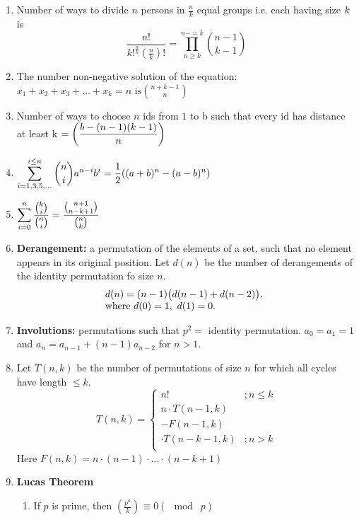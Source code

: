 \begin{enumerate}
    \item Number of ways to divide $n$ persons in $\displaystyle \frac{n}{k}$ equal groups i.e. each having size $\displaystyle \displaystyle k$ is
    \[\displaystyle \frac{n!}{k!^{\frac{n}{k}} \left( \frac{n}{k} \right) !}= \prod \limits_{n \geq k}^{n-=k}{n-1 \choose k-1}\]
    \item The number non-negative solution of the equation: $\displaystyle x_1+x_2+x_3+\dots+x_k=n \text{ is}{n+k-1 \choose n}$
    \item Number of ways to choose $n$ ids from $\displaystyle 1$ to b such that every id has distance at least k $\displaystyle \displaystyle =\left( \frac{b-(n-1)(k-1)}{n} \right)$
    \item $\displaystyle \displaystyle \sum \limits_{i=1,3,5,\dots}^{i\leq n} \binom{n}{i} a^{n-i}b^i = \frac{1}{2} ((a+b)^n-(a-b)^n)$
    \item $\displaystyle \displaystyle \sum \limits_{i=0}^{n} \dfrac{\binom{k}{i}}{\binom{n}{i}} = \dfrac{\binom{n+1}{n-k+1}}{\binom{n}{k}}$
    \item \textbf{Derangement:} a permutation of the elements of a set, such that no element appears in its original position. Let $d(n)$ be the number of derangements of the identity permutation fo size $n$.
    \[\begin{array}{@{}l}d(n) = (n - 1)\bigl(d(n - 1) + d(n - 2)\bigr),\\ \text{where } d(0)=1,\ d(1)=0.\end{array}\]
    \item \textbf{Involutions:} permutations such that $\displaystyle p^2 =$ identity permutation. $\displaystyle a_0 = a_1 = 1$ and $\displaystyle a_n=a_{n-1} + (n-1)a_{n-2}$ for $n>1$.
    \item Let $T(n,k)$ be the number of permutations of size $n$ for which all cycles have length $\displaystyle \leq k$.
    \[T(n, k)=
    \begin{cases}
      n! & ; n \le k\\
      n \cdot T(n-1, k) \\ - F(n-1, k) \\ \cdot T(n-k-1, k) & ;n > k \\
    \end{cases}\]
    Here $\displaystyle F(n, k) = n \cdot (n - 1) \cdot \dots \cdot (n - k + 1)$
    \item \textbf{Lucas Theorem}
    \begin{enumerate}
      \item If $\displaystyle p$ is prime, then $\displaystyle \left(\frac{p^{a}}{k}\right) \equiv 0 (\mod\; p)$

\end{enumerate}
\end{enumerate}
